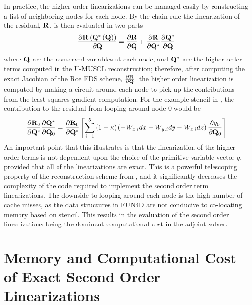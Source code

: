 In practice, the higher order linearizations can be managed easily by
constructing a list of neighboring nodes for each node.  By the chain rule the
linearization of the residual, $\mathbf R$, is then evaluated in two parts
\begin{equation}
  \frac{\partial \mathbf R\left(\mathbf Q^*\left( \mathbf Q \right) \right)}{\partial \mathbf Q} = 
  \frac{\partial \mathbf R}{\partial \mathbf Q} + \frac{\partial \mathbf R}{\partial \mathbf Q^{*}}\frac{\partial \mathbf Q^*}{\partial \mathbf Q}
  \label{residual-high-low}
\end{equation}
where $\mathbf Q$ are the conserved variables at each node, and $\mathbf Q^*$ are the higher
order terms computed in the U-MUSCL reconstruction; therefore, after computing
the exact Jacobian of the Roe FDS scheme, $\frac{\partial \mathbf R}{\partial \mathbf Q}$, the higher order
linearization is computed by making a circuit around each node to pick up the
contributions from the least squares gradient computation.  For the example
stencil in , the contribution to the residual from
looping around node 0 would be
\begin{equation}
  \frac{\partial \mathbf R_0}{\partial \mathbf Q^*}\frac{\partial \mathbf Q^*}{\partial \mathbf Q_0} = \frac{\partial \mathbf R_0}{\partial \mathbf Q^*} \left[\sum_{i=1}^5{(1-\kappa)
  \left( -W_{x,i}dx - W_{y,i}dy - W_{z,i}dz \right) \frac{\partial q_0}{\partial \mathbf Q_0}}\right]
  \label{ho-linearization}
\end{equation}
An important point that this illustrates is that the linearization of the higher
order terms is not dependent upon the choice of the primitive variable vector
$q$, provided that all of the linearizations are exact.  This is a powerful
telescoping property of the reconstruction scheme from
, and it significantly decreases the
complexity of the code required to implement the second order term
linearizations.  The downside to looping around each node is the high number of
cache misses, as the data structures in FUN3D are not conducive to co-locating
memory based on stencil.  This results in the evaluation of the second order
linearizations being the dominant computational cost in the adjoint solver.

\section{Memory and Computational Cost of Exact Second Order Linearizations}
\label{sec:2nd-order-mem-cost}

